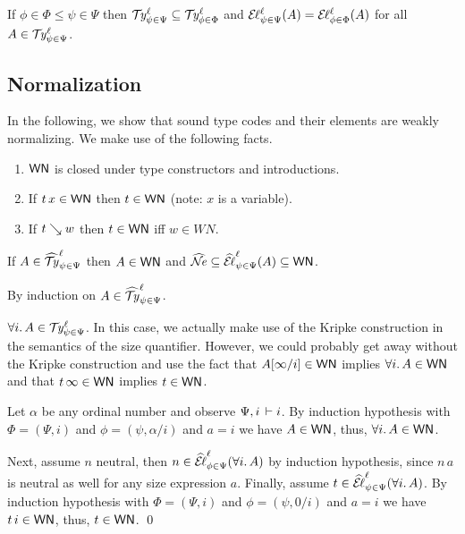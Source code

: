 \documentclass[acmsmall,screen]{acmart}\settopmatter{}
\makeatletter
\newenvironment{proof*}[1][\proofname]{\par
  \normalfont \topsep6\p@\@plus6\p@\relax
  \trivlist
  \item[\@proofindent\hskip\labelsep
        {\@proofnamefont #1\@addpunct{.}}]\ignorespaces
}{%
  \endtrivlist\@endpefalse
}
\renewcommand{\forallT}[2]{\forall #1.\,#2}
\renewcommand{\sext}[3]{(#1,#3/#2)}
\makeatother
\begin{document}
\begin{lemma}[Monotonicity]
  If $\phi \in \Phi \leq \psi \in \Psi$ then
  $\TY \Psi \psi \ell \subseteq \TY \Phi \phi \ell$ and
  $\EL \Psi \psi \ell A = \EL \Phi \phi \ell A$ for all
  $A \in \TY \Psi \psi \ell$.
\end{lemma}


\subsection{Normalization}

In the following, we show that sound type codes and their elements are
weakly normalizing.  We make use of the following facts.
\begin{lemma} \bla
  \begin{enumerate}
  \item $\WN$ is closed under type constructors and introductions.
  \item If\/ $t\,x \in \WN$ then $t \in \WN$ (note: $x$ is a variable).
  \item If\/ $t \evalsto w$ then $t \in \WN$ iff $w \in WN$.
  \end{enumerate}
\end{lemma}
\begin{theorem}
  If $A \in \TYhat \Psi \psi \ell$ then $A \in \WN$ and
  $\widehat\NE \subseteq \ELhat \Psi \psi \ell A \subseteq \WN$.
\end{theorem}
\noindent
\begin{proof*}
By induction on $A \in \TYhat \Psi \psi \ell$.
\begin{caselist}
\nextcase $\forallT i A \in \TY \Psi \psi \ell$.
In this case, we actually make use of the Kripke construction in the
semantics of the size quantifier.  However, we could probably get away
without the Kripke construction and use the fact that
$\subst \infty i A \in \WN$ implies $\forallT i A \in \WN$ and that
$t\,\infty \in \WN$ implies $t \in \WN$.

Let $\alpha$ be any ordinal number and observe $\Psi,i \der i$.  By
induction hypothesis with $\Phi = (\Psi,i)$ and
$\phi = \sext \psi i \alpha$ and $a = i$ we have $A \in \WN$, thus,
$\forallT i A \in \WN$.

Next, assume $n$ neutral, then
$n \in \ELhat \Psi \phi \ell {\forallT i A}$ by induction hypothesis,
since $n\,a$ is neutral as well for any size expression $a$.
Finally, assume $t \in \ELhat \Psi \psi \ell {\forallT i A}$.  By
induction hypothesis with $\Phi = (\Psi,i)$ and
$\phi = \sext \psi i 0$ and $a = i$ we have $t\,i \in \WN$, thus,
$t \in \WN$.
\qed
\end{caselist}
\end{proof*}
\end{document}
